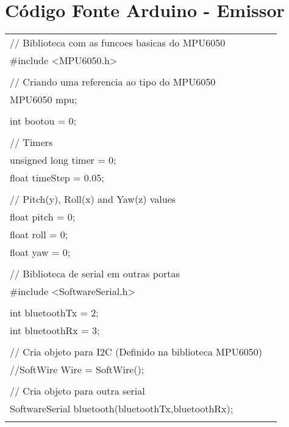 \chapter{Código Fonte Arduino - Emissor}
 \label{app:apendiceA}
 
        \newcolumntype{R}{>{\raggedright\arraybackslash}}

    
 \begin{longtable}{Rp{15cm}}
 \hline

// Biblioteca com as funcoes basicas do MPU6050 \\
\#include <MPU6050.h> \\
\\
// Criando uma referencia ao tipo do MPU6050 \\
MPU6050 mpu; \\
\\
int bootou = 0; \\
\\
// Timers \\
unsigned long timer = 0; \\
float timeStep = 0.05; \\
\\
// Pitch(y), Roll(x) and Yaw(z) values \\
float pitch = 0; \\
float roll = 0; \\
float yaw = 0; \\
\\
// Biblioteca de serial em outras portas \\
\#include <SoftwareSerial.h> \\
\\
int bluetoothTx = 2; \\
int bluetoothRx = 3; \\
\\
// Cria objeto para I2C (Definido na biblioteca MPU6050) \\
//SoftWire Wire = SoftWire(); \\
\\
// Cria objeto para outra serial \\
SoftwareSerial bluetooth(bluetoothTx,bluetoothRx); \\
\\

\end{longtable}
